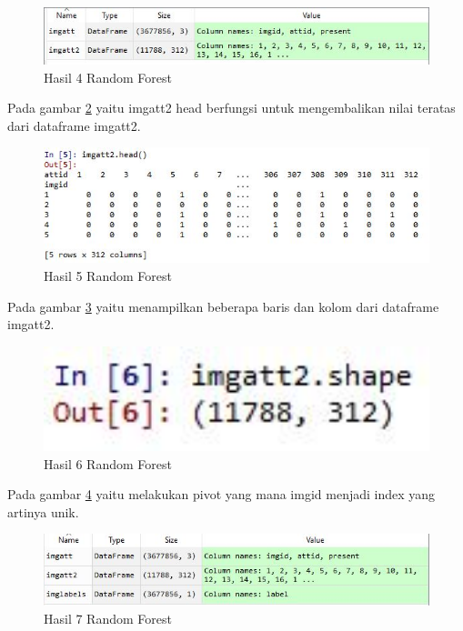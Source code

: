 \begin{enumerate}
\begin{figure}[!htbp]
	\centerline{\includegraphics[width=1\textwidth]{figures/huda/chapter3_praktek/7.JPG}}
	\caption{Hasil 4 Random Forest}
	\label{h11}
\end{figure}
\subitem Pada gambar \ref{h12} yaitu imgatt2 head berfungsi untuk mengembalikan nilai teratas dari dataframe imgatt2.
\begin{figure}[!htbp]
	\centerline{\includegraphics[width=1\textwidth]{figures/huda/chapter3_praktek/8.JPG}}
	\caption{Hasil 5 Random Forest}
	\label{h12}
\end{figure}
\subitem Pada gambar \ref{h13} yaitu menampilkan beberapa baris dan kolom dari dataframe imgatt2. 
\begin{figure}[!htbp]
	\centerline{\includegraphics[width=1\textwidth]{figures/huda/chapter3_praktek/9.JPG}}
	\caption{Hasil 6 Random Forest}
	\label{h13}
\end{figure}
\subitem Pada gambar \ref{h14} yaitu melakukan pivot yang mana imgid menjadi index yang artinya unik.
\begin{figure}[!htbp]
	\centerline{\includegraphics[width=1\textwidth]{figures/huda/chapter3_praktek/10.JPG}}
	\caption{Hasil 7 Random Forest}
	\label{h14}

\end{figure}
\end{enumerate}
